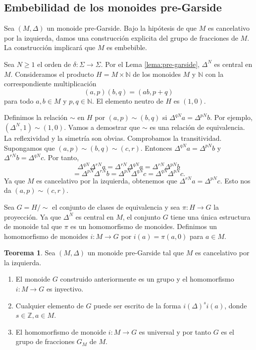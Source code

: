 \documentclass[12pt]{book}
\theoremstyle{definition}
\newtheorem{teor}{Teorema}[section]
\begin{document}
\subsection{Embebilidad de los monoides pre-Garside}

Sea $(M,\Delta)$ un monoide pre-Garside. Bajo la hipótesis de que $M$ es cancelativo por la izquierda, damos una construcción explicita del grupo de fracciones de $M$. La construcción implicará que $M$ es embebible.

Sea $N\geq 1$ el orden de $\delta:\Sigma\rightarrow\Sigma$. Por el Lema \ref{lema:pre-garside}, $\Delta^N$ es central en $M$. Consideramos el producto $H=M\times\mathbb{N}$ de los monoides $M$ y $\mathbb{N}$ con la correspondiente multiplicación
$$(a,p)(b,q)=(ab,p+q)$$
para todo $a,b\in M$ y $p,q\in\mathbb{N}$. El elemento neutro de $H$ es $(1,0)$.

Definimos la relación $\sim$ en $H$ por $(a,p)\sim(b,q)$ si $\Delta^{qN}a=\Delta^{pN}b$. Por ejemplo, $(\Delta^{N},1)\sim(1,0)$. Vamos a demostrar que $\sim$ es una relación de equivalencia. La reflexividad y la simetría son obvias. Comprobamos la transitividad. Supongamos que $(a,p)\sim(b,q)\sim(c,r)$. Entonces $\Delta^{qN}a=\Delta^{pN}b$ y $\Delta^{rN}b=\Delta^{qN}c$. Por tanto,
$$\Delta^{qN}\Delta^{rN}a=\Delta^{rN}\Delta^{qN}a=\Delta^{rN}\Delta^{pN}b$$
$$=\Delta^{pN}\Delta^{rN}b=\Delta^{pN}\Delta^{qN}c=\Delta^{qN}\Delta^{pN}c.$$
Ya que $M$ es cancelativo por la izquierda, obtenemos que $\Delta^{rN}a=\Delta^{pN}c$. Esto nos da $(a,p)\sim(c,r)$.

Sea $G=H/\sim$ el conjunto de clases de equivalencia y sea $\pi:H\rightarrow G$ la proyección. Ya que $\Delta^N$ es central en $M$, el conjunto $G$ tiene una única estructura de monoide tal que $\pi$ es un homomorfismo de monoides. Definimos un homomorfismo de monoides $i:M\rightarrow G$ por $i(a)=\pi(a,0)$ para $a\in M$.

\begin{teor}
Sea $(M,\Delta)$ un monoide pre-Garside tal que $M$ es cancelativo por la izquierda.
\begin{enumerate}[label=(\roman*)]
\item El monoide $G$ construido anteriormente es un grupo y el homomorfismo $i:M\rightarrow G$ es inyectivo.
\item Cualquier elemento de $G$ puede ser escrito de la forma $i(\Delta)^si(a)$, donde $s\in\mathbb{Z}, a\in M$.
\item El homomorfismo de monoide $i:M\rightarrow G$ es universal y por tanto $G$ es el grupo de fracciones $G_M$ de $M$.
\end{enumerate}
\label{teor:pre-garside}
\end{teor}
\end{document}
